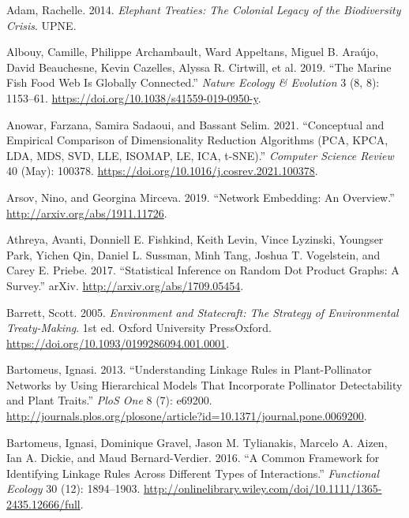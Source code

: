 \documentclass[
  letterpaper,
  DIV=11,
  numbers=noendperiod]{scrartcl}
\newlength{\cslhangindent}
\newlength{\cslentryspacingunit} %
\newenvironment{CSLReferences}[2] %
 {%
  \setlength{\parindent}{0pt}
  \ifodd #1
  \let\oldpar\par
  \def\par{\hangindent=\cslhangindent\oldpar}
  \fi
  \setlength{\parskip}{#2\cslentryspacingunit}
 }%
 {}
\begin{document}
\hypertarget{refs}{}
\begin{CSLReferences}{1}{0}
\leavevmode{}%
Adam, Rachelle. 2014. \emph{Elephant Treaties: {The Colonial} Legacy of
the Biodiversity Crisis}. {UPNE}.

\leavevmode{}%
Albouy, Camille, Philippe Archambault, Ward Appeltans, Miguel B. Araújo,
David Beauchesne, Kevin Cazelles, Alyssa R. Cirtwill, et al. 2019.
{``The Marine Fish Food Web Is Globally Connected.''} \emph{Nature
Ecology \& Evolution} 3 (8, 8): 1153--61.
\url{https://doi.org/10.1038/s41559-019-0950-y}.

\leavevmode{}%
Anowar, Farzana, Samira Sadaoui, and Bassant Selim. 2021. {``Conceptual
and Empirical Comparison of Dimensionality Reduction Algorithms ({PCA},
{KPCA}, {LDA}, {MDS}, {SVD}, {LLE}, {ISOMAP}, {LE}, {ICA}, t-{SNE}).''}
\emph{Computer Science Review} 40 (May): 100378.
\url{https://doi.org/10.1016/j.cosrev.2021.100378}.

\leavevmode{}%
Arsov, Nino, and Georgina Mirceva. 2019. {``Network {Embedding}: {An
Overview}.''} \url{http://arxiv.org/abs/1911.11726}.

\leavevmode{}%
Athreya, Avanti, Donniell E. Fishkind, Keith Levin, Vince Lyzinski,
Youngser Park, Yichen Qin, Daniel L. Sussman, Minh Tang, Joshua T.
Vogelstein, and Carey E. Priebe. 2017. {``Statistical Inference on
Random Dot Product Graphs: A Survey.''} {arXiv}.
\url{http://arxiv.org/abs/1709.05454}.

\leavevmode{}%
Barrett, Scott. 2005. \emph{Environment and {Statecraft}: {The Strategy}
of {Environmental Treaty-Making}}. 1st ed. {Oxford University
PressOxford}. \url{https://doi.org/10.1093/0199286094.001.0001}.

\leavevmode{}%
Bartomeus, Ignasi. 2013. {``Understanding Linkage Rules in
Plant-Pollinator Networks by Using Hierarchical Models That Incorporate
Pollinator Detectability and Plant Traits.''} \emph{PloS One} 8 (7):
e69200.
\url{http://journals.plos.org/plosone/article?id=10.1371/journal.pone.0069200}.

\leavevmode{}%
Bartomeus, Ignasi, Dominique Gravel, Jason M. Tylianakis, Marcelo A.
Aizen, Ian A. Dickie, and Maud Bernard-Verdier. 2016. {``A Common
Framework for Identifying Linkage Rules Across Different Types of
Interactions.''} \emph{Functional Ecology} 30 (12): 1894--1903.
\url{http://onlinelibrary.wiley.com/doi/10.1111/1365-2435.12666/full}.


\end{CSLReferences}
\end{document}
